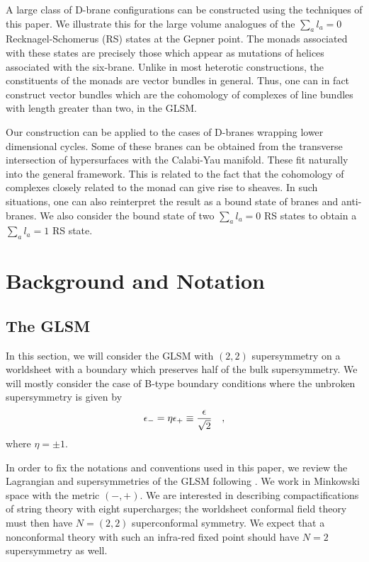 \documentclass[a4paper,12pt]{article}
\begin{document}
A large class of D-brane configurations can be constructed using the
techniques of this paper. We illustrate this for the large volume
analogues of the $\sum_a l_a=0$  Recknagel-Schomerus (RS) states\cite{RS} at the
Gepner point. The monads associated with these states are precisely
those which appear as mutations of helices associated with the
six-brane. Unlike in most heterotic constructions, the constituents of the 
monads are vector bundles in general. Thus, one can in fact construct
vector bundles which are the cohomology of complexes of line bundles
with length greater than two, in the GLSM. 


Our construction can be applied to the cases of D-branes wrapping lower
dimensional cycles. Some of these branes can be obtained from the
transverse intersection of hypersurfaces with the Calabi-Yau manifold.
These fit naturally into the general framework. This is related to the
fact that the cohomology of 
complexes closely related to the monad can give rise to
sheaves. In such situations, one can also reinterpret the result as
a bound state of branes and anti-branes\cite{bpsalgebra}. We also
consider the bound state of two $\sum_a l_a=0$  RS
states to obtain a $\sum_a l_a=1$ RS state.





\section{Background and Notation}
\subsection{The GLSM}

In this section, we will consider the GLSM with $(2,2)$ supersymmetry
on a worldsheet with a boundary which preserves half of the bulk
supersymmetry. We will mostly consider the case of B-type boundary
conditions where the unbroken supersymmetry is given by
$$
\epsilon_-=\eta\epsilon_+ \equiv {\epsilon\over\sqrt2}\quad,
$$
where $\eta=\pm1$.


In order to fix the notations and conventions used in this paper,
we review the Lagrangian and
supersymmetries of the GLSM following \cite{wittenphases}.  We work in
Minkowski space with the metric $(-,+)$.  We are interested in describing
compactifications of string theory with eight supercharges; the worldsheet
conformal field theory must then have $N=(2,2)$ superconformal symmetry. 
We expect that a nonconformal theory with such an infra-red fixed
point should have $N=2$ supersymmetry as well. 
\end{document}
